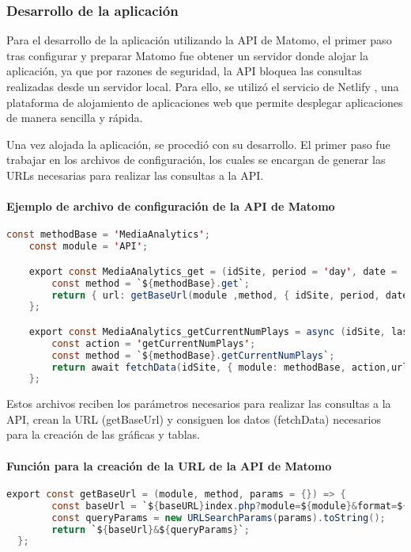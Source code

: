 \subsubsection{Desarrollo de la aplicación}
\label{sec:desarrollo-aplicacion}
Para el desarrollo de la aplicación utilizando la API de Matomo, el primer paso tras configurar y preparar Matomo fue obtener un 
servidor donde alojar la aplicación, ya que por razones de seguridad, la API bloquea las consultas realizadas desde un servidor local. 
Para ello, se utilizó el servicio de Netlify \cite{netlify}, una plataforma de alojamiento de aplicaciones web que permite desplegar aplicaciones 
de manera sencilla y rápida.

Una vez alojada la aplicación, se procedió con su desarrollo. El primer paso fue trabajar en los archivos de configuración, 
los cuales se encargan de generar las URLs necesarias para realizar las consultas a la API.

\paragraph{Ejemplo de archivo de configuración de la API de Matomo}
\begin{lstlisting}[language=Java]
    const methodBase = 'MediaAnalytics';
    const module = 'API';

    export const MediaAnalytics_get = (idSite, period = 'day', date = '2023-12-01,2024-07-01') => {
        const method = `${methodBase}.get`;
        return { url: getBaseUrl(module ,method, { idSite, period, date }), title: 'Overall Metrics' };
    };

    export const MediaAnalytics_getCurrentNumPlays = async (idSite, lastMinutes = 180) => {
        const action = 'getCurrentNumPlays';
        const method = `${methodBase}.getCurrentNumPlays`;
        return await fetchData(idSite, { module: methodBase, action,url: getBaseUrl(module ,method, { idSite, lastMinutes })});
    };

\end{lstlisting}

Estos archivos reciben los parámetros necesarios para realizar las consultas a la API, crean la URL (getBaseUrl) y consiguen los
datos (fetchData) necesarios para la creación de las gráficas y tablas. 

\paragraph{Función para la creación de la URL de la API de Matomo}
\begin{lstlisting}[language=Java]
    export const getBaseUrl = (module, method, params = {}) => {
        const baseUrl = `${baseURL}index.php?module=${module}&format=${format}&method=${method}&token_auth=${token_auth}`;
        const queryParams = new URLSearchParams(params).toString();
        return `${baseUrl}&${queryParams}`;
  };
\end{lstlisting}


